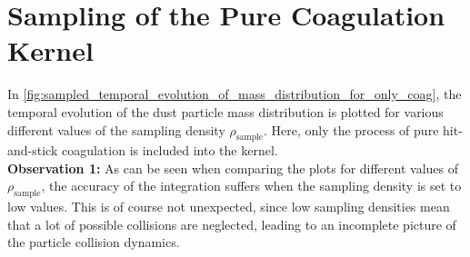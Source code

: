






    \cleardoublepage\section{Sampling of the Pure Coagulation Kernel}

        In \cref{fig:sampled_temporal_evolution_of_mass_distribution_for_only_coag}, the 
        temporal evolution of the dust particle mass distribution is plotted for 
        various different values of the sampling density $\rho_\text{sample}$. Here, 
        only the process of pure hit-and-stick coagulation is included into the kernel. \\

        \textbf{Observation 1:} As can be seen when comparing the plots for different 
        values of $\rho_\text{sample}$, the accuracy of the integration suffers when 
        the sampling density is set to low values. This is of course not unexpected,
        since low sampling densities mean that a lot of possible collisions are neglected,
        leading to an incomplete picture of the particle collision dynamics. \\

